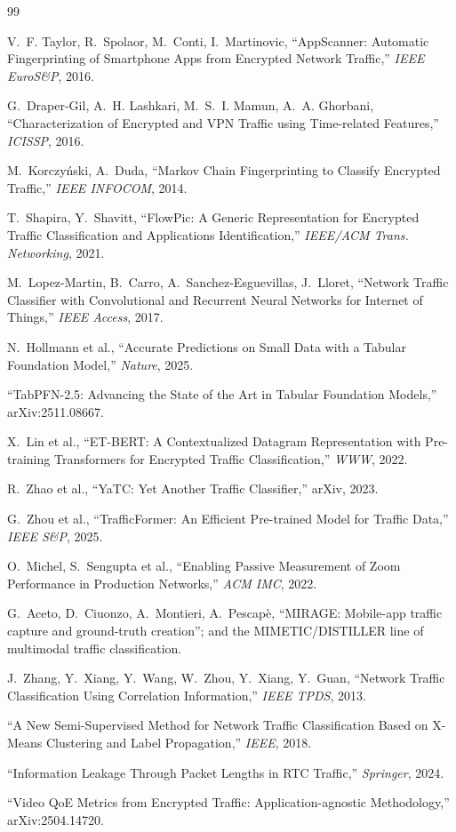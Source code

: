 \documentclass[11pt]{article}
\begin{document}
\begin{thebibliography}{99}\small

 V.~F. Taylor, R.~Spolaor, M.~Conti, I.~Martinovic, ``AppScanner: Automatic
Fingerprinting of Smartphone Apps from Encrypted Network Traffic,'' \emph{IEEE EuroS\&P}, 2016.

 G.~Draper-Gil, A.~H. Lashkari, M.~S.~I. Mamun, A.~A. Ghorbani, ``Characterization of
Encrypted and VPN Traffic using Time-related Features,'' \emph{ICISSP}, 2016.

 M.~Korczy\'nski, A.~Duda, ``Markov Chain Fingerprinting to Classify Encrypted Traffic,''
\emph{IEEE INFOCOM}, 2014.

 T.~Shapira, Y.~Shavitt, ``FlowPic: A Generic Representation for Encrypted Traffic
Classification and Applications Identification,'' \emph{IEEE/ACM Trans. Networking}, 2021.

 M.~Lopez-Martin, B.~Carro, A.~Sanchez-Esguevillas, J.~Lloret, ``Network Traffic
Classifier with Convolutional and Recurrent Neural Networks for Internet of Things,'' \emph{IEEE Access},
2017.

 N.~Hollmann et al., ``Accurate Predictions on Small Data with a Tabular Foundation
Model,'' \emph{Nature}, 2025.

 ``TabPFN-2.5: Advancing the State of the Art in Tabular Foundation Models,''
arXiv:2511.08667.

 X.~Lin et al., ``ET-BERT: A Contextualized Datagram Representation with Pre-training
Transformers for Encrypted Traffic Classification,'' \emph{WWW}, 2022.

 R.~Zhao et al., ``YaTC: Yet Another Traffic Classifier,'' arXiv, 2023.

 G.~Zhou et al., ``TrafficFormer: An Efficient Pre-trained Model for Traffic
Data,'' \emph{IEEE S\&P}, 2025.

 O.~Michel, S.~Sengupta et al., ``Enabling Passive Measurement of Zoom Performance in
Production Networks,'' \emph{ACM IMC}, 2022.

 G.~Aceto, D.~Ciuonzo, A.~Montieri, A.~Pescap\`e, ``MIRAGE: Mobile-app traffic capture and
ground-truth creation''; and the MIMETIC/DISTILLER line of multimodal traffic classification.

 J.~Zhang, Y.~Xiang, Y.~Wang, W.~Zhou, Y.~Xiang, Y.~Guan, ``Network Traffic
Classification Using Correlation Information,'' \emph{IEEE TPDS}, 2013.

 ``A New Semi-Supervised Method for Network Traffic Classification Based on X-Means
Clustering and Label Propagation,'' \emph{IEEE}, 2018.

 ``Information Leakage Through Packet Lengths in RTC Traffic,'' \emph{Springer}, 2024.

 ``Video QoE Metrics from Encrypted Traffic: Application-agnostic Methodology,''
arXiv:2504.14720.

\end{thebibliography}
\end{document}
